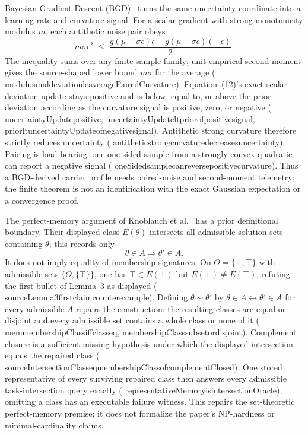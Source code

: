\documentclass[11pt]{article}
\newcommand{\leanname}[1]{{\scriptsize\ttfamily
  \def\_{\textunderscore\allowbreak}#1}}
\begin{document}
Bayesian Gradient Descent (BGD)~\cite{zeno2018bgd} turns the same uncertainty
coordinate into a learning-rate and curvature signal.  For a scalar gradient
with strong-monotonicity modulus $m$, each antithetic noise pair obeys
\[
  m\sigma\epsilon^2 \;\le\;
  \frac{g(\mu+\sigma\epsilon)\epsilon+
        g(\mu-\sigma\epsilon)(-\epsilon)}{2}.
\]
The inequality sums over any finite sample family; unit empirical second
moment gives the source-shaped lower bound $m\sigma$ for the average
(\leanname{modulus\_mul\_deviation\_le\_averagePairedCurvature}).
Equation~(12)'s exact scalar deviation update stays positive and is below,
equal to, or above the prior deviation according as the curvature signal is
positive, zero, or negative
(\leanname{uncertaintyUpdate\_positive},
\leanname{uncertaintyUpdate\_lt\_prior\_of\_positive\_signal},
\leanname{prior\_lt\_uncertaintyUpdate\_of\_negative\_signal}).
Antithetic strong curvature therefore strictly reduces uncertainty
(\leanname{antithetic\_strong\_curvature\_decreases\_uncertainty}).
Pairing is load bearing: one one-sided sample from a strongly convex
quadratic can report a negative signal
(\leanname{oneSided\_sample\_can\_reverse\_positive\_curvature}).
Thus a BGD-derived carrier profile needs paired-noise and second-moment
telemetry; the finite theorem is not an identification with the exact
Gaussian expectation or a convergence proof.

The perfect-memory argument of Knoblauch et
al.~\cite{knoblauch2020optimal} has a prior definitional boundary.  Their
displayed class $E(\theta)$ intersects all admissible solution sets containing
$\theta$; this records only
\[
  \theta\in A \Longrightarrow \theta'\in A.
\]
It does not imply equality of membership signatures.  On
$\Theta=\{\bot,\top\}$ with admissible sets
$\{\Theta,\{\top\}\}$, one has
$\top\in E(\bot)$ but $E(\bot)\ne E(\top)$, refuting the first bullet of
Lemma~3 as displayed
(\leanname{source\_Lemma3\_first\_claim\_counterexample}).
Defining $\theta\sim\theta'$ by
$\theta\in A\leftrightarrow\theta'\in A$ for every admissible $A$ repairs the
construction: the resulting classes are equal or disjoint and every
admissible set contains a whole class or none of it
(\leanname{mem\_membershipClass\_iff\_class\_eq},
\leanname{membershipClass\_subset\_or\_disjoint}).  Complement closure is a
sufficient missing hypothesis under which the displayed intersection equals
the repaired class
(\leanname{sourceIntersectionClass\_eq\_membershipClass\_of\_complementClosed}).
One stored representative of every surviving repaired class then answers
every admissible task-intersection query exactly
(\leanname{representativeMemory\_is\_intersectionOracle}); omitting a class
has an executable failure witness.  This repairs the set-theoretic
perfect-memory premise; it does not formalize the paper's NP-hardness or
minimal-cardinality claims.
\end{document}
